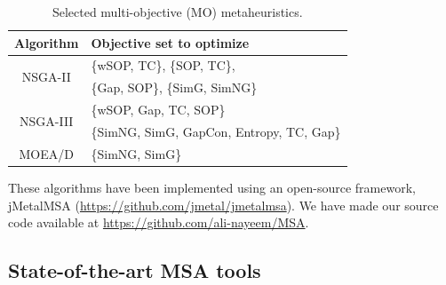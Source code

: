\begin{table}[!htbp]
\centering
	\caption{Selected multi-objective (MO) metaheuristics.}
	\begin{tabular}{|c|l|} \hline
		Algorithm & Objective set to optimize \\
		\hline
		\multicolumn{1}{|c|}{\multirow{2}{*}{NSGA-II}} & \{wSOP, TC\}, 
		\{SOP, TC\},          \\
		& \{Gap, SOP\},
		\{SimG, SimNG\} \\
		\hline
		\multicolumn{1}{|c|}{\multirow{2}{*}{NSGA-III}} & \{wSOP, Gap, TC, SOP\} \\
		& \{SimNG, SimG, GapCon, Entropy, TC, Gap\} \\
		\hline
		\multicolumn{1}{|c|}{\multirow{1}{*}{MOEA/D}} & \{SimNG, SimG\}\\
		\hline
	\end{tabular}\label{tab:variants}\end{table}These algorithms have been implemented using an open-source framework, jMetalMSA (\url{https://github.com/jmetal/jmetalmsa}). We have made our source code available at \url{https://github.com/ali-nayeem/MSA}.\subsection{State-of-the-art MSA tools}
